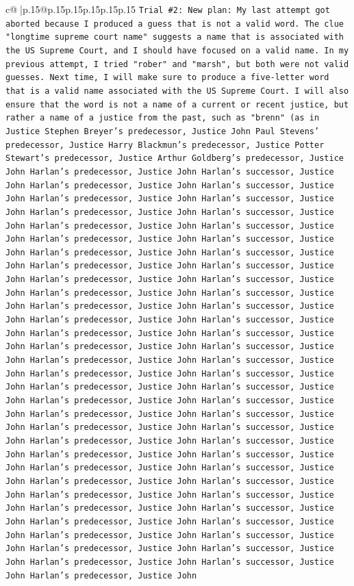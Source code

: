 \documentclass{article}
\begin{document}
{\begin{supertabular}{c@{$\;$}|p{.15\linewidth}@{}p{.15\linewidth}p{.15\linewidth}p{.15\linewidth}p{.15\linewidth}p{.15\linewidth}}
{{{\texttt{Trial \#2: New plan: My last attempt got aborted because I produced a guess that is not a valid word. The clue "longtime supreme court name" suggests a name that is associated with the US Supreme Court, and I should have focused on a valid name. In my previous attempt, I tried "rober" and "marsh", but both were not valid guesses. Next time, I will make sure to produce a five{-}letter word that is a valid name associated with the US Supreme Court. I will also ensure that the word is not a name of a current or recent justice, but rather a name of a justice from the past, such as "brenn" (as in Justice Stephen Breyer's predecessor, Justice John Paul Stevens' predecessor, Justice Harry Blackmun's predecessor, Justice Potter Stewart's predecessor, Justice Arthur Goldberg's predecessor, Justice John Harlan's predecessor, Justice John Harlan's successor, Justice John Harlan's predecessor, Justice John Harlan's successor, Justice John Harlan's predecessor, Justice John Harlan's successor, Justice John Harlan's predecessor, Justice John Harlan's successor, Justice John Harlan's predecessor, Justice John Harlan's successor, Justice John Harlan's predecessor, Justice John Harlan's successor, Justice John Harlan's predecessor, Justice John Harlan's successor, Justice John Harlan's predecessor, Justice John Harlan's successor, Justice John Harlan's predecessor, Justice John Harlan's successor, Justice John Harlan's predecessor, Justice John Harlan's successor, Justice John Harlan's predecessor, Justice John Harlan's successor, Justice John Harlan's predecessor, Justice John Harlan's successor, Justice John Harlan's predecessor, Justice John Harlan's successor, Justice John Harlan's predecessor, Justice John Harlan's successor, Justice John Harlan's predecessor, Justice John Harlan's successor, Justice John Harlan's predecessor, Justice John Harlan's successor, Justice John Harlan's predecessor, Justice John Harlan's successor, Justice John Harlan's predecessor, Justice John Harlan's successor, Justice John Harlan's predecessor, Justice John Harlan's successor, Justice John Harlan's predecessor, Justice John Harlan's successor, Justice John Harlan's predecessor, Justice John Harlan's successor, Justice John Harlan's predecessor, Justice John Harlan's successor, Justice John Harlan's predecessor, Justice John Harlan's successor, Justice John Harlan's predecessor, Justice John Harlan's successor, Justice John Harlan's predecessor, Justice John Harlan's successor, Justice John Harlan's predecessor, Justice John Harlan's successor, Justice John Harlan's predecessor, Justice John Harlan's successor, Justice John Harlan's predecessor, Justice John Harlan's successor, Justice John Harlan's predecessor, Justice John Harlan's successor, Justice John Harlan's predecessor, Justice John Harlan's successor, Justice John Harlan's predecessor, Justice John} \\
}}}
\end{supertabular}}
\end{document}
